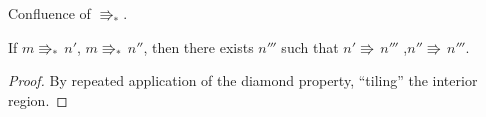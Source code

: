 \begin{thm} Confluence of $\Rrightarrow_{\ast}$.
 
If $m\Rrightarrow_{\ast}\,n'$, $m\Rrightarrow_{\ast}\,n''$, then there exists $n'''$ such that $n'\Rrightarrow\,n'''$ ,$n''\Rrightarrow\,n'''$.
\end{thm}
\begin{proof}
By repeated application of the diamond property, ``tiling'' the interior region.

\end{proof}
